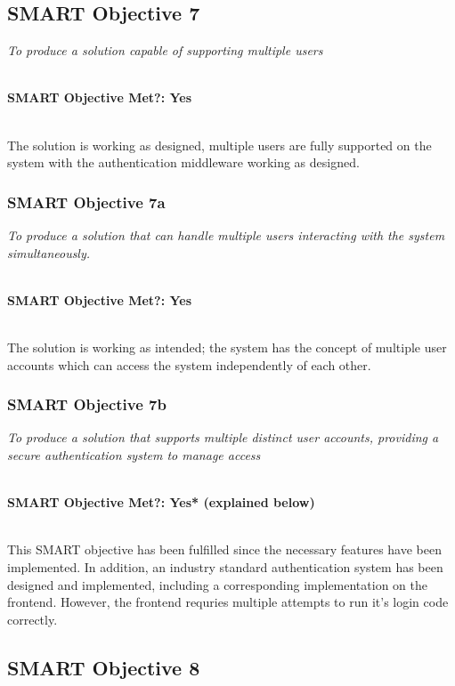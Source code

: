 \documentclass[../main.tex]{subfiles}
\begin{document}
\subsection{SMART Objective 7}

\textit{To produce a solution capable of supporting multiple users}

\noindent \\ \textbf{SMART Objective Met?: Yes}

\noindent \\ The solution is working as designed, multiple users
are fully supported on the system with the authentication middleware working
as designed.

\subsubsection{SMART Objective 7a}

\textit{To produce a solution that can handle multiple users interacting
    with the system simultaneously.}

\noindent \\ \textbf{SMART Objective Met?: Yes}

\noindent \\ The solution is working as intended; the system has
the concept of multiple user accounts which can access the system
independently of each other.


\subsubsection{SMART Objective 7b}

\textit{To produce a solution that supports multiple distinct user
    accounts, providing a secure authentication system to manage access}

\noindent \\ \textbf{SMART Objective Met?: Yes* (explained below)}

\noindent \\ This SMART objective has been fulfilled since the necessary
features have been implemented. In addition, an industry standard authentication system
has been designed and implemented, including a corresponding implementation
on the frontend. However, the frontend requries multiple attempts to run it's
login code correctly.


\subsection{SMART Objective 8}
\end{document}
